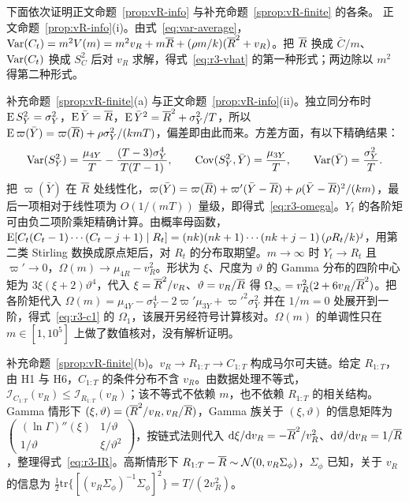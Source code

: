 下面依次证明正文命题~\ref{prop:vR-info} 与补充命题~\ref{sprop:vR-finite} 的各条。
正文命题~\ref{prop:vR-info}(i)。由式~\eqref{eq:var-average}，$\operatorname{Var}(C_t)=m^2V(m)=m^2v_R+m\overline{R}+(\rho m/k)(\overline{R}^2+v_R)$。把 $\overline{R}$ 换成 $\bar C/m$、$\operatorname{Var}(C_t)$ 换成 $S_C^2$ 后对 $v_R$ 求解，得式~\eqref{eq:r3-vhat} 的第一种形式；两边除以 $m^2$ 得第二种形式。

补充命题~\ref{sprop:vR-finite}(a) 与正文命题~\ref{prop:vR-info}(ii)。独立同分布时 $\operatorname{E} S_Y^2=\sigma_Y^2$，$\operatorname{E}\bar Y=\overline{R}$，$\operatorname{E}\bar Y^2=\overline{R}^2+\sigma_Y^2/T$，所以 $\operatorname{E}\varpi(\bar Y)=\varpi(\overline{R})+\rho\sigma_Y^2/(kmT)$，偏差即由此而来。方差方面，有以下精确结果\citep{casella2002statistical}：
\begin{equation}
  \operatorname{Var}(S_Y^2)=\frac{\mu_{4Y}}{T}-\frac{(T-3)\sigma_Y^4}{T(T-1)},\qquad
  \operatorname{Cov}(S_Y^2,\bar Y)=\frac{\mu_{3Y}}{T},\qquad
  \operatorname{Var}(\bar Y)=\frac{\sigma_Y^2}{T}.
\end{equation}
把 $\varpi(\bar Y)$ 在 $\overline{R}$ 处线性化，$\varpi(\bar Y)=\varpi(\overline{R})+\varpi'(\bar Y-\overline{R})+\rho(\bar Y-\overline{R})^2/(km)$，最后一项相对于线性项为 $O(1/(mT))$ 量级，即得式~\eqref{eq:r3-omega}。$Y_t$ 的各阶矩可由负二项阶乘矩精确计算。由概率母函数，$\operatorname{E}[C_t(C_t-1)\cdots(C_t-j+1)\mid R_t]=(nk)(nk+1)\cdots(nk+j-1)\,(\rho R_t/k)^j$，用第二类 Stirling 数换成原点矩后，对 $R_t$ 的分布取期望。$m\to\infty$ 时 $Y_t\to R_t$ 且 $\varpi'\to0$，$\Omega(m)\to\mu_{4R}-v_R^2$。形状为 $\xi$、尺度为 $\vartheta$ 的 Gamma 分布的四阶中心矩为 $3\xi(\xi+2)\vartheta^4$，代入 $\xi=\overline{R}^2/v_R$、$\vartheta=v_R/\overline{R}$ 得 $\Omega_\infty=v_R^2(2+6v_R/\overline{R}^2)$。把各阶矩代入 $\Omega(m)=\mu_{4Y}-\sigma_Y^4-2\varpi'\mu_{3Y}+\varpi'^2\sigma_Y^2$ 并在 $1/m=0$ 处展开到一阶，得式~\eqref{eq:r3-c1} 的 $\Omega_1$，该展开另经符号计算核对。$\Omega(m)$ 的单调性只在 $m\in[1,10^5]$ 上做了数值核对，没有解析证明。

补充命题~\ref{sprop:vR-finite}(b)。$v_R\to R_{1:T}\to C_{1:T}$ 构成马尔可夫链。给定 $R_{1:T}$，由 H1 与 H6，$C_{1:T}$ 的条件分布不含 $v_R$。由数据处理不等式，$\mathcal I_{C_{1:T}}(v_R)\leq\mathcal I_{R_{1:T}}(v_R)$；该不等式不依赖 $m$，也不依赖 $R_{1:T}$ 的相关结构。Gamma 情形下 $(\xi,\vartheta)=(\overline{R}^2/v_R,v_R/\overline{R})$，Gamma 族关于 $(\xi,\vartheta)$ 的信息矩阵为 $\begin{pmatrix}(\ln\Gamma)''(\xi)&1/\vartheta\\1/\vartheta&\xi/\vartheta^2\end{pmatrix}$，按链式法则代入 $\mathrm d\xi/\mathrm dv_R=-\overline{R}^2/v_R^2$、$\mathrm d\vartheta/\mathrm dv_R=1/\overline{R}$，整理得式~\eqref{eq:r3-IR}。高斯情形下 $R_{1:T}-\overline{R}\sim\mathcal N(0,v_R\Sigma_\phi)$，$\Sigma_\phi$ 已知，关于 $v_R$ 的信息为 $\tfrac12\mathrm{tr}\{[(v_R\Sigma_\phi)^{-1}\Sigma_\phi]^2\}=T/(2v_R^2)$。

